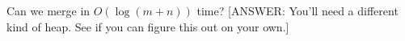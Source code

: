 Can we merge in $O(\log (m + n))$ time?
[ANSWER: You'll need a different kind of heap.
See if you can figure this out on your own.]
